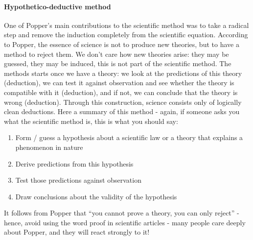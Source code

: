 \documentclass{tufte-book}
\begin{document}
\paragraph{Hypothetico-deductive method} One of Popper's main contributions to the scientific method was to take a radical step and remove the induction completely from the scientific equation. According to Popper, the essence of science is not to produce new theories, but to have a method to reject them. We don't care how new theories arise: they may be guessed, they may be induced, this is not part of the scientific method. The methods starts once we have a theory: we look at the predictions of this theory (deduction), we can test it against observation and see whether the theory is compatible with it (deduction), and if not, we can conclude that the theory is wrong (deduction). Through this construction, science consists only of logically clean deductions. Here a summary of this method - again, if someone asks you what the scientific method is, this is what you should say:


\begin{enumerate}
\item Form / guess a hypothesis about a scientific law or a theory that explains a phenomenon in nature
\item Derive predictions from this hypothesis
\item Test those predictions against observation
\item Draw conclusions about the validity of the hypothesis
\end{enumerate}

It follows from Popper that ``you cannot prove a theory, you can only reject'' - hence, avoid using the word proof in scientific articles - many people care deeply about Popper, and they will react strongly to it!




\end{document}

